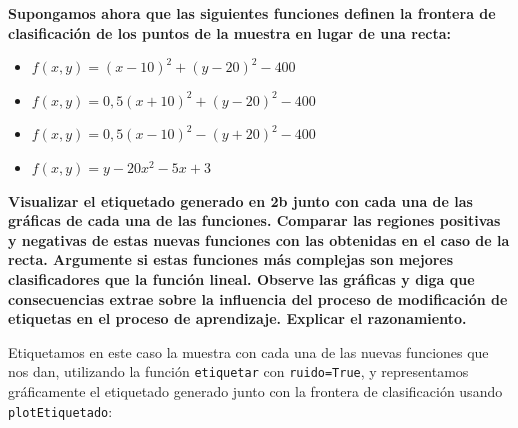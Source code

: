 \documentclass[a4]{article}
\begin{document}
\textbf{Supongamos ahora que las siguientes funciones definen la frontera de
clasificación de los puntos de la muestra en lugar de una recta:}
\begin{itemize}
	\item $ f (x, y) = (x - 10)^2 + (y - 20)^2 - 400 $
	\item $ f (x, y) = 0,5(x + 10)^2 + (y - 20)^2 - 400 $
	\item $ f (x, y) = 0,5(x - 10)^2 - (y + 20)^2 - 400 $
	\item $ f (x, y) = y - 20x^2 - 5x + 3 $
\end{itemize}
\textbf{Visualizar el etiquetado generado en 2b junto con cada una de las gráficas de cada
una de las funciones. Comparar las regiones positivas y negativas de estas nuevas
funciones con las obtenidas en el caso de la recta. Argumente si estas funciones más
complejas son mejores clasificadores que la función lineal. Observe las gráficas y diga
que consecuencias extrae sobre la influencia del proceso de modificación de etiquetas
en el proceso de aprendizaje. Explicar el razonamiento.}

Etiquetamos en este caso la muestra con cada una de las nuevas funciones que nos dan, utilizando la función \lstinline|etiquetar| con \lstinline|ruido=True|, y representamos gráficamente el etiquetado generado junto con la frontera de clasificación usando \lstinline|plotEtiquetado|:

\begin{figure}[H]
	\centering    
	\caption{}
	\label{fig:fronteras1}
\end{figure}
\end{document}
